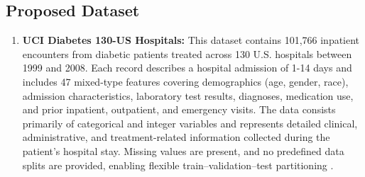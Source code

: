 \documentclass[master,proposal,extern,palatino]{rgseThesis}
\begin{document}
\subsection{Proposed Dataset}
\begin{enumerate}\itemsep0.25em
  \item \textbf{UCI Diabetes 130-US Hospitals:} This dataset contains 101,766 inpatient encounters from diabetic patients treated across 130 U.S. hospitals between 1999 and 2008. Each record describes a hospital admission of 1-14 days and includes 47 mixed-type features covering demographics (age, gender, race), admission characteristics, laboratory test results, diagnoses, medication use, and prior inpatient, outpatient, and emergency visits. The data consists primarily of categorical and integer variables and represents detailed clinical, administrative, and treatment-related information collected during the patient’s hospital stay. Missing values are present, and no predefined data splits are provided, enabling flexible train–validation–test partitioning \parencite{diabetes_db}.
\end{enumerate}
\end{document}
